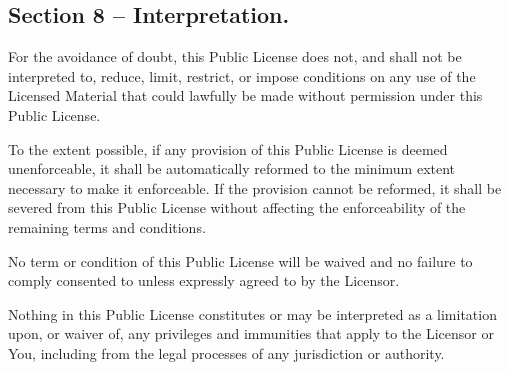 \documentclass[12pt,a4paper]{article}
\begin{document}
\subsection*{Section 8 – Interpretation.}

\begin{description}
\setlength{\itemsep}{0cm}
\item[a.]
    For the avoidance of doubt, this Public License does not, and shall not be interpreted to, reduce, limit, restrict, or impose conditions on any use of the Licensed Material that could lawfully be made without permission under this Public License.
\item[b.] To the extent possible, if any provision of this Public License is deemed unenforceable, it shall be automatically reformed to the minimum extent necessary to make it enforceable. If the provision cannot be reformed, it shall be severed from this Public License without affecting the enforceability of the remaining terms and conditions.
\item[c.]    No term or condition of this Public License will be waived and no failure to comply consented to unless expressly agreed to by the Licensor.
\item[d.]    Nothing in this Public License constitutes or may be interpreted as a limitation upon, or waiver of, any privileges and immunities that apply to the Licensor or You, including from the legal processes of any jurisdiction or authority.
\end{description}
\end{document}
